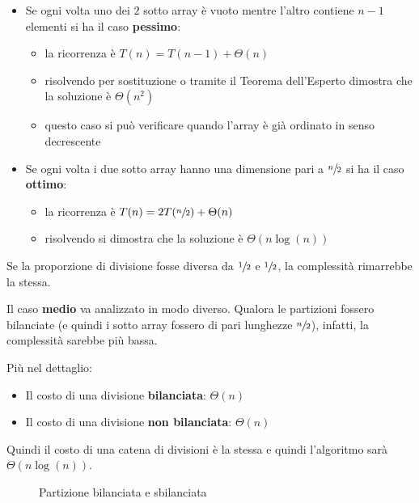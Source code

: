 \documentclass[italian, 10pt]{article}
\begin{document}
\begin{itemize}
  \item Se ogni volta uno dei \(2\) sotto array è vuoto mentre l'altro contiene \(n-1\) elementi si ha il caso \textbf{pessimo}:
        \begin{itemize}
          \item la ricorrenza è \(T(n) = T(n - 1) + \Theta(n)\)
          \item risolvendo per sostituzione o tramite il Teorema dell'Esperto dimostra che la soluzione è \(\Theta(n^2)\)
          \item questo caso si può verificare quando l'array è già ordinato in senso decrescente
        \end{itemize}
  \item Se ogni volta i due sotto array hanno una dimensione pari a \(\sfrac{n}{2}\) si ha il caso \textbf{ottimo}:
        \begin{itemize}
          \item la ricorrenza è \(T(n) = 2T(\sfrac{n}{2}) + \Theta(n)\)
          \item risolvendo si dimostra che la soluzione è \(\Theta(n \log{(n)})\)
        \end{itemize}
\end{itemize}

Se la proporzione di divisione fosse diversa da \(\sfrac{1}{2}\) e \(\sfrac{1}{2}\), la complessità rimarrebbe la stessa.

\bigskip
Il caso \textbf{medio} va analizzato in modo diverso.
Qualora le partizioni fossero bilanciate (e quindi i sotto array fossero di pari lunghezze \(\sfrac{n}{2}\)), infatti, la complessità sarebbe più bassa.

Più nel dettaglio:

\begin{itemize}
  \item Il costo di una divisione \textbf{bilanciata}: \(\Theta(n)\)
  \item Il costo di una divisione \textbf{non bilanciata}: \(\Theta(n)\)
\end{itemize}

Quindi il costo di una catena di divisioni è la stessa e quindi l'algoritmo sarà \(\Theta(n \log{(n)})\).

\begin{figure}[htbp]
  \bigskip
  \centering
  \caption{Partizione bilanciata e sbilanciata}
  \label{fig:partizione-bilanciata-sbilanciata}
  \bigskip
\end{figure}
\end{document}
